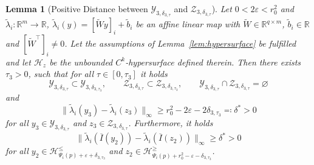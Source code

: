 \documentclass[10pt]{article}
\numberwithin{equation}{section}
\newtheorem{lemma}[theorem]{Lemma}
\newcommand{\eps}{\varepsilon}
\newcommand\norm[1]{\left\lVert#1\right\rVert}
\newcommand\normm[1]{\big\lVert#1\big\lVert}
\begin{document}
	
	\begin{lemma}[Positive Distance between $ \mathcal{Y}_{3,\delta_{3,\tau}}$ and $\mathcal{Z}_{3,\delta_{3,\tau}}$] \label{lem:distance}
		Let $0<2\eps<r_0^2$ and  $\tilde \lambda_i: \mathbb{R}^m \rightarrow \mathbb{R}$, $\tilde\lambda_i(y) = [\widetilde{W}y]_i + \tilde  b_i$ be an affine linear map with  $\widetilde{W}\in\mathbb{R}^{q \times m}$, $\tilde b_i \in \mathbb{R}$ and $[\widetilde{W}^\top]_i \neq 0$.  Let the assumptions of Lemma~\ref{lem:hypersurface} be fulfilled and let $\mathcal{H}_z$ be the unbounded $C^k$-hypersurface defined therein. Then there exists $\tau_3>0$, such that for all $\tau\in [0,\tau_3]$ it holds
		\begin{equation*}
			\mathcal{Y}_{3,\delta_{3,\tau}}\subset \mathcal{Y}_{3,\delta_{3,\tau_3}}, \qquad  \mathcal{Z}_{3,\delta_{3,\tau}}\subset\mathcal{Z}_{3,\delta_{3,\tau_3}}, \qquad \mathcal{Y}_{3,\delta_{3,\tau}} \cap	\mathcal{Z}_{3,\delta_{3,\tau}} = \varnothing
		\end{equation*} 
		and 
		\begin{equation*}
			\normm{\tilde{\lambda}_i(y_3)-\tilde{\lambda}_i(z_3)}_\infty \geq 	r_0^2-2\eps- 2\delta_{3,\tau_3} \eqqcolon \delta^\ast > 0
		\end{equation*}
		for all $y_3 \in \mathcal{Y}_{3,\delta_{3,\tau}}$ and $z_3 \in \mathcal{Z}_{3,\delta_{3,\tau}}$. Furthermore, it holds
		\begin{equation*}
			\normm{\tilde{\lambda}_i(\overline{I}(y_2))-\tilde{\lambda}_i(\overline{I}(z_2))}_\infty \geq \delta^\ast > 0
		\end{equation*}
		for all $y_2\in	\mathcal{H}^{\leq}_{\Psi_i(p)+\eps+\delta_{3,\tau_3}}$  and $z_2\in\mathcal{H}^{\geq}_{\Psi_i(p)+r_0^2-\eps-\delta_{3,\tau_3}}$. 
	\end{lemma}
	
\end{document}

